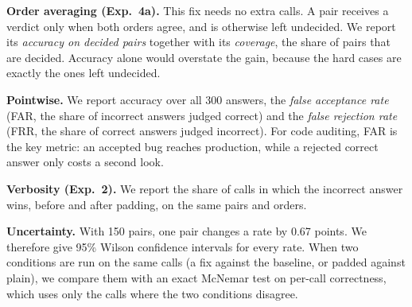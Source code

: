 \textbf{Order averaging (Exp.~4a).} This fix needs no extra calls. A pair receives a verdict only when both
orders agree, and is otherwise left undecided. We report its \emph{accuracy on decided pairs} together with
its \emph{coverage}, the share of pairs that are decided. Accuracy alone would overstate the gain, because
the hard cases are exactly the ones left undecided.

\textbf{Pointwise.} We report accuracy over all 300 answers, the \emph{false acceptance rate} (FAR, the
share of incorrect answers judged correct) and the \emph{false rejection rate} (FRR, the share of correct
answers judged incorrect). For code auditing, FAR is the key metric: an accepted bug reaches production,
while a rejected correct answer only costs a second look.

\textbf{Verbosity (Exp.~2).} We report the share of calls in which the incorrect answer wins, before and
after padding, on the same pairs and orders.

\textbf{Uncertainty.} With 150 pairs, one pair changes a rate by 0.67 points. We therefore give 95\%
Wilson confidence intervals for every rate. When two conditions are run on the same calls (a fix against the
baseline, or padded against plain), we compare them with an exact McNemar test on per-call correctness,
which uses only the calls where the two conditions disagree.
